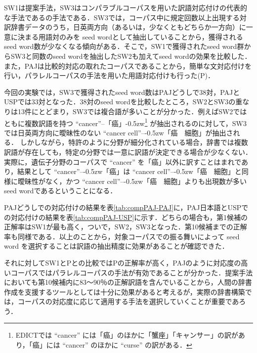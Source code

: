 \documentclass[japanese]{jnlp_1.3e}
\begin{document}
SW1は提案手法，SW3はコンパラブルコーパスを用いた訳語対応付けの代表的な手法である\cite{Fung_and_McKeown97}の手法である．SW3では，コーパス中に規定回数以上出現する対訳辞書データのうち，日英両方向（あるいは，少なくともどちらか一方向）に一意に決まる用語対のみを seed wordとして抽出していることから，獲得されるseed word数が少なくなる傾向がある．そこで，SW1で獲得されたseed word群からSW3と同数のseed wordを抽出したSW2も加えてseed wordの効果を比較した．また，PAJは比較的対応の取れたコーパスであることから，簡単な文対応付けを行い，パラレルコーパスの手法を用いた用語対応付けも行った(P)．

今回の実験では，SW3で獲得されたseed word数はPAJどうしで38対，PAJとUSPでは33対となった．38対のseed wordを比較したところ，SW2とSW3の重なりは13件にとどまり，SW3では複合語が多いことが分かった．例えばSW2ではともに複数訳語を持つ ``cancer''--\linebreak[4]「癌」{\kern-0.5zw}\footnote{EDICTでは ``cancer'' には「癌」のほかに「蟹座」「キャンサー」の訳があり，「癌」には ``cancer'' のほかに ``curse'' の訳がある．} が抽出されるのに対して，SW3では日英両方向に曖昧性のない ``cancer cell''--{\kern-0.5zw}「癌　細胞」が抽出される． しかしながら，特許のように分野が細分化されている場合，辞書では複数訳語が存在しても，特定の分野では一意に訳語が決定できる場合が少なくない．実際に，遺伝子分野のコーパスで ``cancer'' を「癌」以外に訳すことはまれであり，結果として ``cancer''--{\kern-0.5zw}「癌」は ``cancer cell''--{\kern-0.5zw}「癌　細胞」と同様に曖昧性がなく，かつ ``cancer cell''--{\kern-0.5zw}「癌　細胞」よりも出現数が多いseed wordであるということになる．

\begin{table}[b]

\end{table}
\begin{table}[b]

\vspace{-1\baselineskip}
\end{table}

PAJどうしでの対応付けの結果を表\ref{tab:compPAJ-PAJ}に，PAJ日本語とUSPでの対応付けの結果を表\ref{tab:compPAJ-USP}に示す．どちらの場合も，第1候補の正解率はSW1が最も高く，ついで，SW2，SW3となった．第10候補までの正解率も同様である．以上のことから，対象コーパスでの振る舞いによって seed word を選択することは訳語の抽出精度に効果があることが確認できた．


それに対してSW1とPとの比較ではPの正解率が高く，PAJのように対応度の高いコーパスではパラレルコーパスの手法が有効であることが分かった．提案手法においても第10候補内に83〜90％の正解訳語を含んでいることから，人間の辞書作成を支援するツールとしては十分に効果があると考えるが，実際の辞書構築では，コーパスの対応度に応じて適用する手法を選択していくことが重要であろう．
\end{document}
